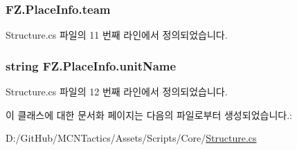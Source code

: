 \subsubsection[{\texorpdfstring{team}{team}}]{ F\+Z.\+Place\+Info.\+team}\hypertarget{class_f_z_1_1_place_info_a4c4273b5ac4af33a2e2bf30bf3df95e2}{}\label{class_f_z_1_1_place_info_a4c4273b5ac4af33a2e2bf30bf3df95e2}


Structure.\+cs 파일의 11 번째 라인에서 정의되었습니다.

\subsubsection[{\texorpdfstring{unit\+Name}{unitName}}]{\setlength{\rightskip}{0pt plus 5cm}string F\+Z.\+Place\+Info.\+unit\+Name}\hypertarget{class_f_z_1_1_place_info_abd92beeaae0520e38d1ed26698db2d05}{}\label{class_f_z_1_1_place_info_abd92beeaae0520e38d1ed26698db2d05}


Structure.\+cs 파일의 12 번째 라인에서 정의되었습니다.



이 클래스에 대한 문서화 페이지는 다음의 파일로부터 생성되었습니다.\+:\begin{DoxyCompactItemize}
\item 
D\+:/\+Git\+Hub/\+M\+C\+N\+Tactics/\+Assets/\+Scripts/\+Core/\hyperlink{_structure_8cs}{Structure.\+cs}\end{DoxyCompactItemize}
